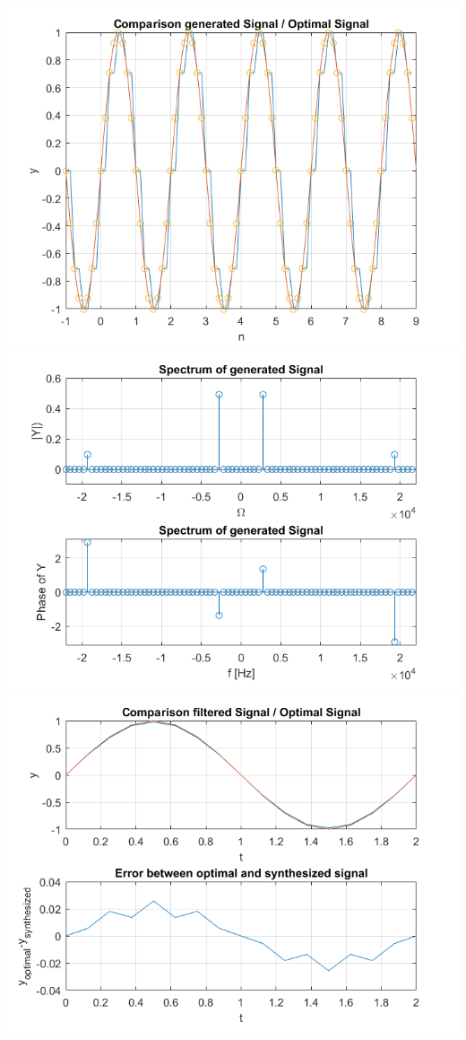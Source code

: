 \includegraphics[scale=0.45]{../ue04_b3_1.png}
\includegraphics[scale=0.45]{../ue04_b3_2.png}
\\
\includegraphics[scale=0.45]{../ue04_b3_3.png}
